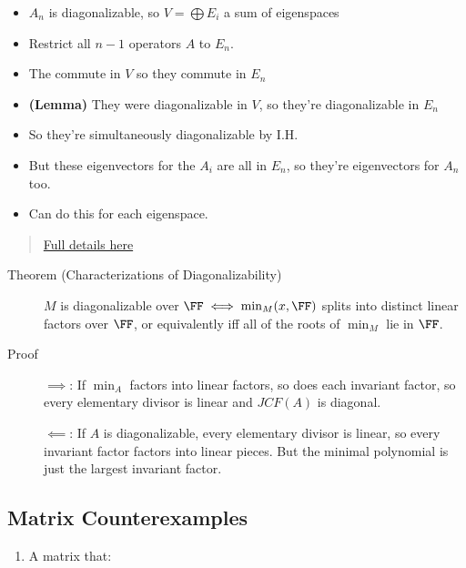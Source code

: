 \begin{description}
\begin{itemize}
\tightlist
\item
  \(A_n\) is diagonalizable, so \(V = \bigoplus E_i\) a sum of
  eigenspaces
\item
  Restrict all \(n-1\) operators \(A\) to \(E_n\).
\item
  The commute in \(V\) so they commute in \(E_n\)
\item
  \textbf{(Lemma)} They were diagonalizable in \(V\), so they're
  diagonalizable in \(E_n\)
\item
  So they're simultaneously diagonalizable by I.H.
\item
  But these eigenvectors for the \(A_i\) are all in \(E_n\), so they're
  eigenvectors for \(A_n\) too.
\item
  Can do this for each eigenspace.
\end{itemize}
\end{description}

\begin{quote}
\href{https://kconrad.math.uconn.edu/blurbs/linmultialg/minpolyandappns.pdf\#page=9}{Full
details here}
\end{quote}

\begin{description}
\item[Theorem (Characterizations of Diagonalizability)]
\(M\) is diagonalizable over \(\FF \iff \min_M(x, \FF)\) splits into
distinct linear factors over \(\FF\), or equivalently iff all of the
roots of \(\min_M\) lie in \(\FF\).
\item[Proof]
\(\implies\): If \(\min_A\) factors into linear factors, so does each
invariant factor, so every elementary divisor is linear and \(JCF(A)\)
is diagonal.

\(\impliedby\): If \(A\) is diagonalizable, every elementary divisor is
linear, so every invariant factor factors into linear pieces. But the
minimal polynomial is just the largest invariant factor.
\end{description}

\hypertarget{matrix-counterexamples}{%
\subsection{Matrix Counterexamples}\label{matrix-counterexamples}}

\begin{enumerate}
\def\labelenumi{\arabic{enumi}.}
\tightlist
\item
  A matrix that:
\end{enumerate}

